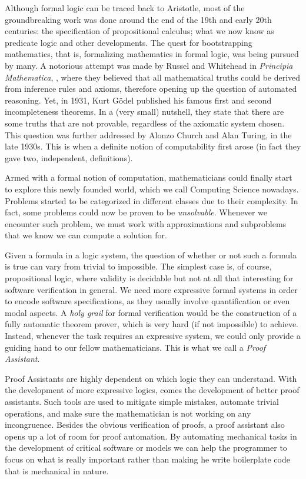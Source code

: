 Although formal logic can be traced back to Aristotle, most of the
groundbreaking work was done around the end of the 19th and early 20th centuries:
the specification of propositional calculus; what we now know as predicate logic and other developments. The quest for bootstrapping mathematics, that is, formalizing mathematics in formal logic, was
being pursued by many. A notorious attempt was made by Russel and Whitehead in \emph{Principia Mathematica}, \cite{Whitehead1912}, where they believed that all mathematical truths
could be derived from inference rules and axioms, therefore opening up the question of automated reasoning. Yet, in 1931, Kurt G\"{o}del published his famous first and second incompleteness theorems. In a (very small) nutshell, they state that there are some truths that are not provable, regardless of the axiomatic system chosen. This question was further addressed by Alonzo Church and Alan Turing, in the late 1930s. This is when a definite notion of computability first arose (in fact they gave two, independent, definitions).

Armed with a formal notion of computation, mathematicians could finally start to explore this newly
founded world, which we call Computing Science nowadays. Problems started to be categorized in 
different classes due to their complexity. In fact, some problems could now be proven to be \emph{unsolvable}.
Whenever we encounter such problem, we must work with approximations and subproblems that we
know we can compute a solution for. 

Given a formula in a logic system, the question of whether or not such a formula is true can vary from trivial to impossible. The simplest case is, of course, propositional logic, where validity is decidable but not at all that interesting
for software verification in general. We need more expressive formal systems in order to encode software specifications, as they usually involve quantification or even modal aspects.  A \emph{holy grail} for formal verification would be the construction of a fully automatic theorem prover, which is very hard (if not impossible) to achieve. Instead, whenever the task requires an expressive system, we could only provide a guiding hand to our fellow mathematicians. This is what we call a \emph{Proof Assistant}.

Proof Assistants are highly dependent on which logic they can understand. With the development of more
expressive logics, comes the development of better proof assistants. Such tools are used to mitigate
simple mistakes, automate trivial operations, and make sure the mathematician is not working
on any incongruence. Besides the obvious verification of proofs, a proof assistant also opens up
a lot of room for proof automation. By automating mechanical tasks in the development of 
critical software or models we can help the programmer to focus on what is really important
rather than making he write boilerplate code that is mechanical in nature.

